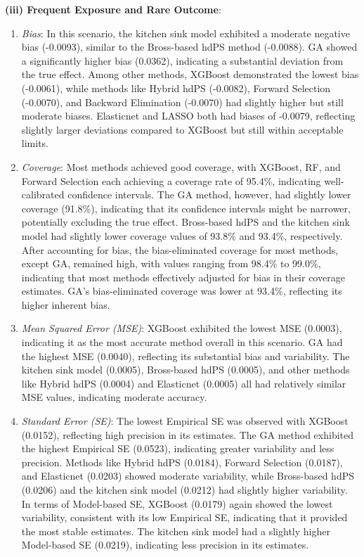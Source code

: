 \documentclass[sn-vancouver,Numbered,lineno,pdflatex]{sn-jnl}
\begin{document}
\textbf{(iii) Frequent Exposure and Rare Outcome}:

\begin{enumerate}
\def\labelenumi{\arabic{enumi}.}
\item
  \emph{Bias}: In this scenario, the kitchen sink model exhibited a
  moderate negative bias (-0.0093), similar to the Bross-based hdPS
  method (-0.0088). GA showed a significantly higher bias (0.0362),
  indicating a substantial deviation from the true effect. Among other
  methods, XGBoost demonstrated the lowest bias (-0.0061), while methods
  like Hybrid hdPS (-0.0082), Forward Selection (-0.0070), and Backward
  Elimination (-0.0070) had slightly higher but still moderate biases.
  Elasticnet and LASSO both had biases of -0.0079, reflecting slightly
  larger deviations compared to XGBoost but still within acceptable
  limits.
\item
  \emph{Coverage}: Most methods achieved good coverage, with XGBoost,
  RF, and Forward Selection each achieving a coverage rate of 95.4\%,
  indicating well-calibrated confidence intervals. The GA method,
  however, had slightly lower coverage (91.8\%), indicating that its
  confidence intervals might be narrower, potentially excluding the true
  effect. Bross-based hdPS and the kitchen sink model had slightly lower
  coverage values of 93.8\% and 93.4\%, respectively. After accounting
  for bias, the bias-eliminated coverage for most methods, except GA,
  remained high, with values ranging from 98.4\% to 99.0\%, indicating
  that most methods effectively adjusted for bias in their coverage
  estimates. GA's bias-eliminated coverage was lower at 93.4\%,
  reflecting its higher inherent bias.
\item
  \emph{Mean Squared Error (MSE)}: XGBoost exhibited the lowest MSE
  (0.0003), indicating it as the most accurate method overall in this
  scenario. GA had the highest MSE (0.0040), reflecting its substantial
  bias and variability. The kitchen sink model (0.0005), Bross-based
  hdPS (0.0005), and other methods like Hybrid hdPS (0.0004) and
  Elasticnet (0.0005) all had relatively similar MSE values, indicating
  moderate accuracy.
\item
  \emph{Standard Error (SE)}: The lowest Empirical SE was observed with
  XGBoost (0.0152), reflecting high precision in its estimates. The GA
  method exhibited the highest Empirical SE (0.0523), indicating greater
  variability and less precision. Methods like Hybrid hdPS (0.0184),
  Forward Selection (0.0187), and Elasticnet (0.0203) showed moderate
  variability, while Bross-based hdPS (0.0206) and the kitchen sink
  model (0.0212) had slightly higher variability. In terms of
  Model-based SE, XGBoost (0.0179) again showed the lowest variability,
  consistent with its low Empirical SE, indicating that it provided the
  most stable estimates. The kitchen sink model had a slightly higher
  Model-based SE (0.0219), indicating less precision in its estimates.
\end{enumerate}
\end{document}
